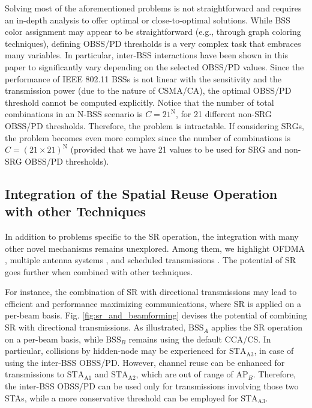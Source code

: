 \documentclass{article}
\begin{document}
Solving most of the aforementioned problems is not straightforward and requires an in-depth analysis to offer optimal or close-to-optimal solutions. While BSS color assignment may appear to be straightforward (e.g., through graph coloring techniques), defining OBSS/PD thresholds is a very complex task that embraces many variables. In particular, inter-BSS interactions have been shown in this paper to significantly vary depending on the selected OBSS/PD values. Since the performance of IEEE 802.11 BSSs is not linear with the sensitivity and the transmission power (due to the nature of CSMA/CA), the optimal OBSS/PD threshold cannot be computed explicitly. Notice that the number of total combinations in an N-BSS scenario is $C = 21^\text{N}$, for 21 different non-SRG OBSS/PD thresholds. Therefore, the problem is intractable. If considering SRGs, the problem becomes even more complex since the number of combinations is $C = (21\times21)^\text{N}$ (provided that we have 21 values to be used for SRG and non-SRG OBSS/PD thresholds).

\subsection{Integration of the Spatial Reuse Operation with other Techniques}

In addition to problems specific to the SR operation, the integration with many other novel mechanisms remains unexplored. Among them, we highlight OFDMA \cite{bankov2018ofdma, dovelos2018optimal}, multiple antenna systems \cite{liao2016mu}, and scheduled transmissions \cite{nurchis2019target}. The potential of SR goes further when combined with other techniques. 

For instance, the combination of SR with directional transmissions may lead to efficient and performance maximizing communications, where SR is applied on a per-beam basis. Fig. \ref{fig:sr_and_beamforming} devises the potential of combining SR with directional transmissions. As illustrated, $\text{BSS}_A$ applies the SR operation on a per-beam basis, while $\text{BSS}_B$ remains using the default CCA/CS. In particular, collisions by hidden-node may be experienced for $\text{STA}_\text{A3}$, in case of using the inter-BSS OBSS/PD. However, channel reuse can be enhanced for transmissions to $\text{STA}_\text{A1}$ and $\text{STA}_\text{A2}$, which are out of range of $\text{AP}_B$. Therefore, the inter-BSS OBSS/PD can be used only for transmissions involving those two STAs, while a more conservative threshold can be employed for $\text{STA}_\text{A3}$.
\end{document}
